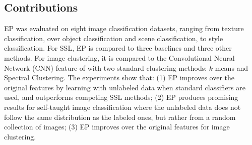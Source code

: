 \subsection{Contributions}
EP was evaluated on eight image classification datasets, ranging from
texture classification, over object classification and scene
classification, to style classification. For SSL, EP is compared
to three baselines and three other methods. For image clustering, it is
compared to the Convolutional Neural Network (CNN) feature of
\citep{deep:bmvc14} with two standard clustering methods: $k$-means and
Spectral Clustering.  The experiments show that: (1) EP improves over
the original features by learning with unlabeled data when standard
classifiers are used, and outperforms competing SSL methods; (2) EP
produces promising results for self-taught image classification where
the unlabeled data does not follow the same distribution as the
labeled ones, but rather from a random collection of images; (3) EP
improves over the original features for image clustering.

